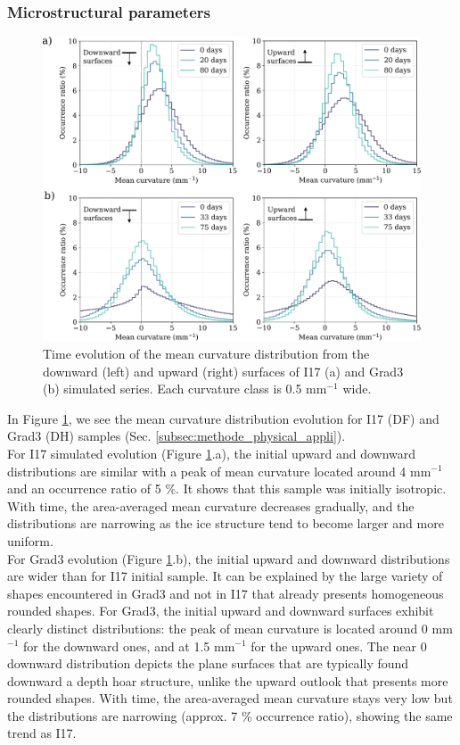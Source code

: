 \documentclass[draft,ms]{agujournal2019}
\begin{document}
\subsubsection{Microstructural parameters}
\begin{figure}
    \centering
    \includegraphics[width=\linewidth]{Figures/histo_i17_grad3_copie_invert.pdf}
    \caption{Time evolution of the mean curvature distribution from the downward (left) and upward (right) surfaces of I17 (a) and Grad3 (b) simulated series. Each curvature class is 0.5 mm$^{-1}$ wide.}
    \label{fig:histo_i17_grad3}
\end{figure}

In Figure \ref{fig:histo_i17_grad3}, we see the mean curvature distribution evolution for I17 (DF) and Grad3 (DH) samples (Sec. \ref{subsec:methode_physical_appli}).\\
For I17 simulated evolution (Figure \ref{fig:histo_i17_grad3}.a), the initial upward and downward distributions are similar with a peak of mean curvature located around 4 mm$^{-1}$ and an occurrence ratio of 5 \%. It shows that this sample was initially isotropic. With time, the area-averaged mean curvature decreases gradually, and the distributions are narrowing as the ice structure tend to become larger and more uniform.\\
For Grad3 evolution (Figure \ref{fig:histo_i17_grad3}.b), the initial upward and downward distributions are wider than for I17 initial sample. It can be explained by the large variety of shapes encountered in Grad3 and not in I17 that already presents homogeneous rounded shapes. For Grad3, the initial upward and downward surfaces exhibit clearly distinct distributions: the peak of mean curvature is located around 0 mm$^{-1}$ for the downward ones, and at 1.5 mm$^{-1}$ for the upward ones. The near 0 downward distribution depicts the plane surfaces that are typically found downward a depth hoar structure, unlike the upward outlook that presents more rounded shapes. With time, the area-averaged mean curvature stays very low but the distributions are narrowing (approx. 7 \% occurrence ratio), showing the same trend as I17.\\
\end{document}
